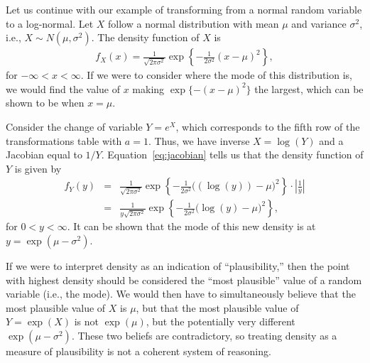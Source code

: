 \documentclass[man]{apa}
\newcommand{\ora}[1]{{#1}}
\newcommand{\blu}[1]{{#1}}
\begin{document}
Let us continue with our example of transforming from a normal random variable to a log-normal. Let $X$ follow a normal distribution with mean $\mu$ and variance $\sigma^2$, i.e., $X\sim N(\mu,\sigma^2)$. The density function of $X$ is 
\begin{eqnarray*}
f_X(x) = \frac{1}{\sqrt{2\pi\sigma^2}}\exp\left\{-\frac{1}{2\sigma^2}(x-\mu)^2\right\},
\end{eqnarray*}
for $-\infty < x < \infty$. If we were to consider where the mode of this distribution is, we would find the value of $x$ making $\exp\{-(x-\mu)^2\}$ the largest, which can be shown to be when $x=\mu$.  

Consider the change of variable $Y=e^X$, which corresponds to the fifth row of the transformations table with $a=1$. Thus, we have inverse $X=\log(Y)$ and a Jacobian equal to $1/Y$. Equation~\ref{eq:jacobian} tells us that the density function of $Y$ is given by
\begin{eqnarray*}
f_Y(y) &=&  \frac{1}{\sqrt{2\pi\sigma^2}}\exp\left\{-\frac{1}{2\sigma^2}\Big(\left(\ora{\log(y)}\right)-\mu\Big)^2\right\}\cdot\left|\blu{\frac{1}{y}}\right|\\
&=& \frac{1}{\blu{y}\sqrt{2\pi\sigma^2}}\exp\left\{-\frac{1}{2\sigma^2}\Big(\ora{\log(y)}-\mu\Big)^2\right\},
\end{eqnarray*}
for $0<y<\infty$. It can be shown that the mode of this new density is at $y=\exp{(\mu-\sigma^2)}$. 

If we were to interpret density as an indication of ``plausibility,'' then the point with highest density should be considered the ``most plausible'' value of a random variable (i.e., the mode). We would then have to simultaneously believe that the most plausible value of $X$ is $\mu$, but that the most plausible value of $Y=\exp{(X)}$ is not $\exp{(\mu)}$, but the potentially very different $\exp{(\mu-\sigma^2)}$. These two beliefs are contradictory, so treating density as a measure of plausibility is not a coherent system of reasoning.

\end{document}
